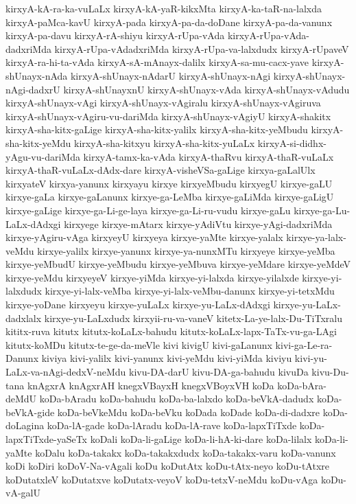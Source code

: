 {kirxyA-kA-ra-ka-vuLaLx
kirxyA-kA-yaR-kikxMta
kirxyA-ka-taR-na-lalxda
kirxyA-paMca-kavU
kirxyA-pada
kirxyA-pa-da-doDane
kirxyA-pa-da-vanunx
kirxyA-pa-davu
kirxyA-rA-shiyu
kirxyA-rUpa-vAda
kirxyA-rUpa-vAda-dadxriMda
kirxyA-rUpa-vAdadxriMda
kirxyA-rUpa-va-lalxdudx
kirxyA-rUpaveV
kirxyA-ra-hi-ta-vAda
kirxyA-sA-mAnayx-dalilx
kirxyA-sa-mu-cacx-yave
kirxyA-shUnayx-nAda
kirxyA-shUnayx-nAdarU
kirxyA-shUnayx-nAgi
kirxyA-shUnayx-nAgi-dadxrU
kirxyA-shUnayxnU
kirxyA-shUnayx-vAda
kirxyA-shUnayx-vAdudu
kirxyA-shUnayx-vAgi
kirxyA-shUnayx-vAgiralu
kirxyA-shUnayx-vAgiruva
kirxyA-shUnayx-vAgiru-vu-dariMda
kirxyA-shUnayx-vAgiyU
kirxyA-shakitx
kirxyA-sha-kitx-gaLige
kirxyA-sha-kitx-yalilx
kirxyA-sha-kitx-yeMbudu
kirxyA-sha-kitx-yeMdu
kirxyA-sha-kitxyu
kirxyA-sha-kitx-yuLaLx
kirxyA-si-didhx-yAgu-vu-dariMda
kirxyA-tamx-ka-vAda
kirxyA-thaRvu
kirxyA-thaR-vuLaLx
kirxyA-thaR-vuLaLx-dAdx-dare
kirxyA-visheVSa-gaLige
kirxya-gaLalUlx
kirxyateV
kirxya-yanunx
kirxyayu
kirxye
kirxyeMbudu
kirxyegU
kirxye-gaLU
kirxye-gaLa
kirxye-gaLanunx
kirxye-ga-LeMba
kirxye-gaLiMda
kirxye-gaLigU
kirxye-gaLige
kirxye-ga-Li-ge-laya
kirxye-ga-Li-ru-vudu
kirxye-gaLu
kirxye-ga-Lu-LaLx-dAdxgi
kirxyege
kirxye-mAtarx
kirxye-yAdiVtu
kirxye-yAgi-dadxriMda
kirxye-yAgiru-vAga
kirxyeyU
kirxyeya
kirxye-yaMte
kirxye-yalalx
kirxye-ya-lalx-veMdu
kirxye-yalilx
kirxye-yanunx
kirxye-ya-nunxMTu
kirxyeye
kirxye-yeMba
kirxye-yeMbudU
kirxye-yeMbudu
kirxye-yeMbuva
kirxye-yeMdare
kirxye-yeMdeV
kirxye-yeMdu
kirxyeyeV
kirxye-yiMda
kirxye-yi-lalxda
kirxye-yilalxde
kirxye-yi-lalxdudx
kirxye-yi-lalx-veMba
kirxye-yi-lalx-veMbu-danunx
kirxye-yi-tetxMdu
kirxye-yoDane
kirxyeyu
kirxye-yuLaLx
kirxye-yu-LaLx-dAdxgi
kirxye-yu-LaLx-dadxlalx
kirxye-yu-LaLxdudx
kirxyii-ru-va-vaneV
kitetx-La-ye-lalx-Du-TiTxralu
kititx-ruva
kitutx
kitutx-koLaLx-bahudu
kitutx-koLaLx-lapx-TaTx-vu-ga-LAgi
kitutx-koMDu
kitutx-te-ge-da-meVle
kivi
kivigU
kivi-gaLanunx
kivi-ga-Le-ra-Danunx
kiviya
kivi-yalilx
kivi-yanunx
kivi-yeMdu
kivi-yiMda
kiviyu
kivi-yu-LaLx-va-nAgi-dedxV-neMdu
kivu-DA-darU
kivu-DA-ga-bahudu
kivuDa
kivu-Du-tana
knAgxrA
knAgxrAH
knegxVBayxH
knegxVBoyxVH
koDa
koDa-bAra-deMdU
koDa-bAradu
koDa-bahudu
koDa-ba-lalxdo
koDa-beVkA-dadudx
koDa-beVkA-gide
koDa-beVkeMdu
koDa-beVku
koDada
koDade
koDa-di-dadxre
koDa-doLagina
koDa-lA-gade
koDa-lAradu
koDa-lA-rave
koDa-lapxTiTxde
koDa-lapxTiTxde-yaSeTx
koDali
koDa-li-gaLige
koDa-li-hA-ki-dare
koDa-lilalx
koDa-li-yaMte
koDalu
koDa-takakx
koDa-takakxdudx
koDa-takakx-varu
koDa-vanunx
koDi
koDiri
koDoV-Na-vAgali
koDu
koDutAtx
koDu-tAtx-neyo
koDu-tAtxre
koDutatxleV
koDutatxve
koDutatx-veyoV
koDu-tetxV-neMdu
koDu-vAga
koDu-vA-galU
}
